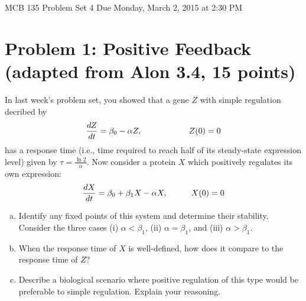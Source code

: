 \documentclass{article}
\begin{document}
\large

MCB 135 Problem Set 4 \hfill Due Monday, March 2, 2015 at 2:30 PM

\section*{Problem 1: Positive Feedback (adapted from Alon 3.4, 15 points)}

In last week's problem set, you showed that a gene $Z$ with simple regulation decribed by
\begin{eqnarray*}
\frac{dZ}{dt} = \beta_0 - \alpha Z, \hspace{2 cm} Z(0)=0
\end{eqnarray*}
has a response time (i.e., time required to reach half of its steady-state expression level) given by $\tau=\frac{\ln 2}{\alpha}$. Now consider a protein $X$ which positively regulates its own expression:
\[ \frac{dX}{dt} = \beta_0 + \beta_1 X  - \alpha X, \hspace{1 cm} X(0)=0\]

\begin{enumerate}[a)]
\setlength{\itemsep}{0pt}
\item Identify any fixed points of this system and determine their stability. Consider the three cases (i) $\alpha < \beta_1$, (ii) $\alpha = \beta_1$, and (iii) $\alpha > \beta_1$.
\item When the response time of $X$ is well-defined, how does it compare to the response time of $Z$?
\item Describe a biological scenario where positive regulation of this type would be preferable to simple regulation. Explain your reasoning.
\end{enumerate}

%
%
%
%
\end{document}
